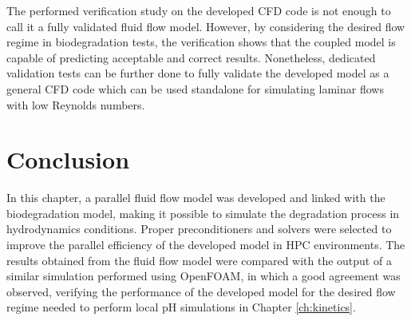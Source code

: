The performed verification study on the developed {CFD} code is not enough to call it a fully validated fluid flow model. However, by considering the desired flow regime in biodegradation tests, the verification shows that the coupled model is capable of predicting acceptable and correct results. Nonetheless, dedicated validation tests can be further done to fully validate the developed model as a general {CFD} code which can be used standalone for simulating laminar flows with low Reynolds numbers.

\section{Conclusion}

In this chapter, a parallel fluid flow model was developed and linked with the biodegradation model, making it possible to simulate the degradation process in hydrodynamics conditions. Proper preconditioners and solvers were selected to improve the parallel efficiency of the developed model in {HPC} environments. The results obtained from the fluid flow model were compared with the output of a similar simulation performed using OpenFOAM, in which a good agreement was observed, verifying the performance of the developed model for the desired flow regime needed to perform local pH simulations in Chapter \ref{ch:kinetics}.









\cleardoublepage
